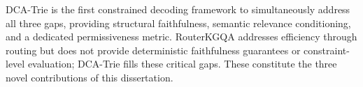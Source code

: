 DCA-Trie is the first constrained decoding framework to simultaneously address all three gaps, providing structural faithfulness, semantic relevance conditioning, and a dedicated permissiveness metric. RouterKGQA addresses efficiency through routing but does not provide deterministic faithfulness guarantees or constraint-level evaluation; DCA-Trie fills these critical gaps. These constitute the three novel contributions of this dissertation.

\begin{table}[H]
    \centering
    \caption{DCA-Trie contribution mapping.}
    \label{tab:contributions}
    \small
\end{table}
